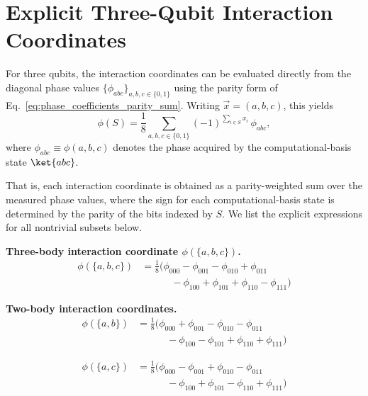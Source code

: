 \section{Explicit Three-Qubit Interaction Coordinates}
\label{app:explicit_3q_invariants}

\noindent
For three qubits, the interaction coordinates can be evaluated directly from the diagonal phase values $\{\phi_{abc}\}_{a,b,c\in\{0,1\}}$ using the parity form of Eq.~\eqref{eq:phase_coefficients_parity_sum}. Writing $\vec{x}=(a,b,c)$, this yields
\begin{equation}
\label{eq:phiS_3q_general}
\phi(S)
=
\frac{1}{8}
\sum_{a,b,c\in\{0,1\}}
(-1)^{\sum_{i\in S} x_i}\,\phi_{abc},
\end{equation}
where $\phi_{abc} \equiv \phi(a,b,c)$ denotes the phase acquired by the computational-basis state $\ket{abc}$.

\medskip
\noindent
That is, each interaction coordinate is obtained as a parity-weighted sum over the measured phase values, where the sign for each computational-basis state is determined by the parity of the bits indexed by $S$. We list the explicit expressions for all nontrivial subsets below.

\medskip
\noindent\textbf{Three-body interaction coordinate $\phi(\{a,b,c\})$.}
\begin{equation}
\boxed{
\begin{aligned}
\phi(\{a,b,c\})
&= \frac{1}{8}\Big(
\phi_{000}
-\phi_{001}
-\phi_{010}
+\phi_{011} \\
&\qquad\quad
-\phi_{100}
+\phi_{101}
+\phi_{110}
-\phi_{111}
\Big)
\end{aligned}
}
\end{equation}

\medskip
\noindent\textbf{Two-body interaction coordinates.}
\begin{equation}
\boxed{
\begin{aligned}
\phi(\{a,b\})
&= \frac{1}{8}\Big(
\phi_{000}
+\phi_{001}
-\phi_{010}
-\phi_{011} \\
&\qquad\quad
-\phi_{100}
-\phi_{101}
+\phi_{110}
+\phi_{111}
\Big)
\end{aligned}
}
\end{equation}

\begin{equation}
\boxed{
\begin{aligned}
\phi(\{a,c\})
&= \frac{1}{8}\Big(
\phi_{000}
-\phi_{001}
+\phi_{010}
-\phi_{011} \\
&\qquad\quad
-\phi_{100}
+\phi_{101}
-\phi_{110}
+\phi_{111}
\Big)
\end{aligned}
}
\end{equation}

